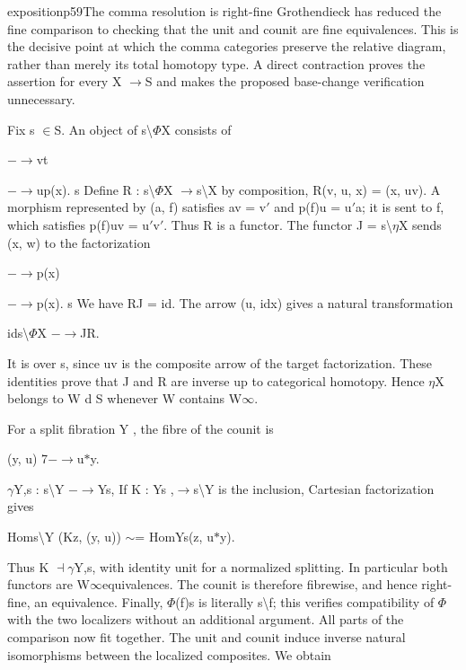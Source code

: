 \begin{dcomment}{exposition}{p59}{The comma resolution is right-fine}
Grothendieck has reduced the fine comparison to checking that the unit and counit are fine equivalences. This is the decisive point at which the comma categories preserve the relative diagram, rather than merely its total homotopy type. A direct contraction proves the assertion for every X \ensuremath{\to}S and makes the proposed base-change verification unnecessary.

Fix s \ensuremath{\in}S. An object of s\textbackslash{}\ensuremath{\Phi}X consists of

\ensuremath{-}\ensuremath{\to}vt

\ensuremath{-}\ensuremath{\to}up(x). s Define R : s\textbackslash{}\ensuremath{\Phi}X \ensuremath{\to}s\textbackslash{}X by composition, R(v, u, x) = (x, uv). A morphism represented by (a, f) satisfies av = v\ensuremath{\prime} and p(f)u = u\ensuremath{\prime}a; it is sent to f, which satisfies p(f)uv = u\ensuremath{\prime}v\ensuremath{\prime}. Thus R is a functor. The functor J = s\textbackslash{}\ensuremath{\eta}X sends (x, w) to the factorization

\ensuremath{-}\ensuremath{\to}p(x)

\ensuremath{-}\ensuremath{\to}p(x). s We have RJ = id. The arrow (u, idx) gives a natural transformation

ids\textbackslash{}\ensuremath{\Phi}X \ensuremath{-}\ensuremath{\to}JR.

It is over s, since uv is the composite arrow of the target factorization. These identities prove that J and R are inverse up to categorical homotopy. Hence \ensuremath{\eta}X belongs to W d S whenever W contains W\ensuremath{\infty}.

For a split fibration Y , the fibre of the counit is

(y, u) 7\ensuremath{-}\ensuremath{\to}u\ensuremath{*}y.

\ensuremath{\gamma}Y,s : s\textbackslash{}Y \ensuremath{-}\ensuremath{\to}Ys, If K : Ys ,\ensuremath{\to}s\textbackslash{}Y is the inclusion, Cartesian factorization gives

Homs\textbackslash{}Y (Kz, (y, u)) \ensuremath{\sim}= HomYs(z, u\ensuremath{*}y).

Thus K \ensuremath{\dashv}\ensuremath{\gamma}Y,s, with identity unit for a normalized splitting. In particular both functors are W\ensuremath{\infty}equivalences. The counit is therefore fibrewise, and hence right-fine, an equivalence. Finally, \ensuremath{\Phi}(f)s is literally s\textbackslash{}f; this verifies compatibility of \ensuremath{\Phi} with the two localizers without an additional argument. All parts of the comparison now fit together. The unit and counit induce inverse natural isomorphisms between the localized composites. We obtain


\end{dcomment}

